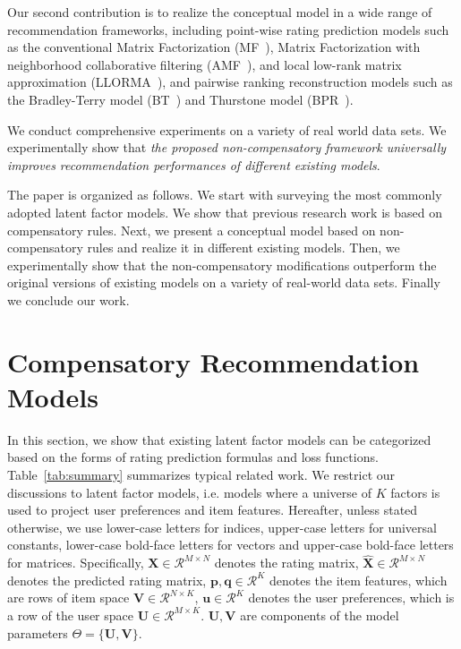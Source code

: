 \documentclass[letterpaper]{article} %
\newcommand{\Real}{\mathcal{R}}
\begin{document}
Our second contribution is to realize the conceptual model in a wide range of recommendation frameworks, including point-wise rating prediction models such as the conventional Matrix Factorization (MF~\cite{Koren2009Matrix}), Matrix Factorization with neighborhood collaborative filtering (AMF~\cite{Koren2008Factorization}), and local low-rank matrix approximation (LLORMA~\cite{Lee2016LLORMA}), and pairwise ranking reconstruction models such as the Bradley-Terry model (BT~\cite{Hu2016Improved}) and Thurstone model (BPR~\cite{Rendle2009BPR}). 

We conduct comprehensive experiments on a variety of real world data sets. We experimentally show that \emph{ the proposed non-compensatory framework universally improves recommendation performances of different existing models}. 

The paper is organized as follows. We start with surveying the most commonly adopted latent factor models. We show that previous research work is based on compensatory rules. Next, we present a conceptual model based on non-compensatory rules and realize it in different existing models. Then, we experimentally show that the non-compensatory modifications outperform the original versions of existing models on a variety of real-world data sets. Finally we conclude our work.

\section{Compensatory Recommendation Models}\label{sec:previousmodel}
In this section, we show that existing latent factor models can be categorized based on the forms of rating prediction formulas and loss functions. Table~\ref{tab:summary} summarizes typical related work. We restrict our discussions to latent factor models, i.e. models where a universe of $K$ factors is used to project  user preferences and item features. Hereafter, unless stated otherwise, we use lower-case letters for indices, upper-case letters for universal constants, lower-case bold-face letters for vectors and upper-case bold-face letters for matrices. Specifically, $\mathbf{X}\in \Real^{M\times N}$ denotes the rating matrix, $\hat{\mathbf{X}}\in \Real^{M\times N}$ denotes the predicted rating matrix,  $\mathbf{p},\mathbf{q}\in \Real^K$ denotes the item features, which are rows of item space $\mathbf{V}\in \Real^{N\times K}$, $\mathbf{u}\in \Real^K$ denotes the user preferences, which is a row of the user space $\mathbf{U}\in \Real^{M\times K}$.  $\mathbf{U},\mathbf{V}$ are components of the model parameters $\Theta=\{\mathbf{U},\mathbf{V} \}$.
\end{document}
